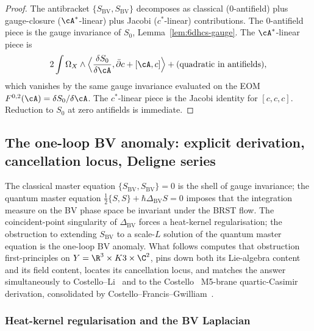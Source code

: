 \begin{proof}
The antibracket $\{S_{\mathrm{BV}}, S_{\mathrm{BV}}\}$ decomposes as
classical ($0$-antifield) plus gauge-closure ($\cA^*$-linear) plus
Jacobi ($c^*$-linear) contributions. The $0$-antifield piece is the
gauge invariance of $S_0$, Lemma~\ref{lem:6dhcs-gauge}. The
$\cA^*$-linear piece is
\[
 2 \int \Omega_X \wedge \Bigl\langle \frac{\delta S_0}{\delta \cA},
 \bar\partial c + [\cA, c]\Bigr\rangle
 + \text{(quadratic in antifields)},
\]
which vanishes by the same gauge invariance evaluated on the EOM
$F^{0,2}(\cA) = \delta S_0 / \delta \cA$. The $c^*$-linear piece is
the Jacobi identity for $[c, c, c]$. Reduction to $S_0$ at zero
antifields is immediate.
\end{proof}

\subsection{The one-loop BV anomaly: explicit derivation, cancellation locus, Deligne series}
\label{subsec:6dhcs-qme}

The classical master equation $\{S_{\mathrm{BV}},S_{\mathrm{BV}}\}=0$
is the shell of gauge invariance; the quantum master equation
$\tfrac12\{S,S\}+\hbar\Delta_{\mathrm{BV}}S=0$ imposes that the
integration measure on the BV phase space be invariant under the
BRST flow. The coincident-point singularity of $\Delta_{\mathrm{BV}}$
forces a heat-kernel regularisation; the obstruction to extending
$S_{\mathrm{BV}}$ to a scale-$L$ solution of the quantum master
equation is the one-loop BV anomaly. What follows computes that
obstruction first-principles on $Y=\R^3\times K3\times\C^2$, pins
down both its Lie-algebra content and its field content, locates its
cancellation locus, and matches the answer simultaneously to
Costello--Li~\cite{CL16} and to the
Costello~\cite{Costello2017M5} M5-brane quartic-Casimir derivation,
consolidated by Costello--Francis--Gwilliam~\cite{CFG2026}.

\subsubsection{Heat-kernel regularisation and the BV Laplacian}
\label{subsubsec:6dhcs-heat-kernel}

